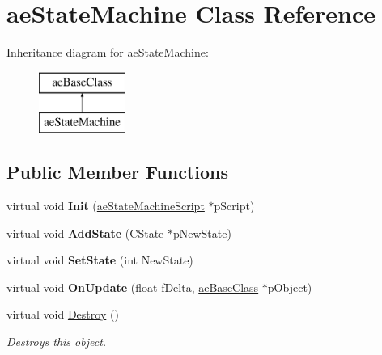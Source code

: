 \hypertarget{classae_state_machine}{}\section{ae\+State\+Machine Class Reference}
\label{classae_state_machine}
Inheritance diagram for ae\+State\+Machine\+:\begin{figure}[H]
\begin{center}
\leavevmode
\includegraphics[height=2.000000cm]{classae_state_machine}
\end{center}
\end{figure}
\subsection*{Public Member Functions}
\begin{DoxyCompactItemize}
\item 
virtual void {\bfseries Init} (\hyperlink{classae_state_machine_script}{ae\+State\+Machine\+Script} $\ast$p\+Script)\hypertarget{classae_state_machine_a393baf6d774bed96d654f77519e6ea42}{}\label{classae_state_machine_a393baf6d774bed96d654f77519e6ea42}

\item 
virtual void {\bfseries Add\+State} (\hyperlink{class_c_state}{C\+State} $\ast$p\+New\+State)\hypertarget{classae_state_machine_a23472ec05602878dd72b525c8b887b83}{}\label{classae_state_machine_a23472ec05602878dd72b525c8b887b83}

\item 
virtual void {\bfseries Set\+State} (int New\+State)\hypertarget{classae_state_machine_a706d878305a519efe2dfbc5c716cca27}{}\label{classae_state_machine_a706d878305a519efe2dfbc5c716cca27}

\item 
virtual void {\bfseries On\+Update} (float f\+Delta, \hyperlink{classae_base_class}{ae\+Base\+Class} $\ast$p\+Object)\hypertarget{classae_state_machine_ac19ecb58275459952c74d377fab91165}{}\label{classae_state_machine_ac19ecb58275459952c74d377fab91165}

\item 
virtual void \hyperlink{classae_state_machine_a562dd6e8de039e4e18c668ee56f0b4b1}{Destroy} ()\hypertarget{classae_state_machine_a562dd6e8de039e4e18c668ee56f0b4b1}{}\label{classae_state_machine_a562dd6e8de039e4e18c668ee56f0b4b1}

\begin{DoxyCompactList}\small\item\em Destroys this object. \end{DoxyCompactList}\end{DoxyCompactItemize}
